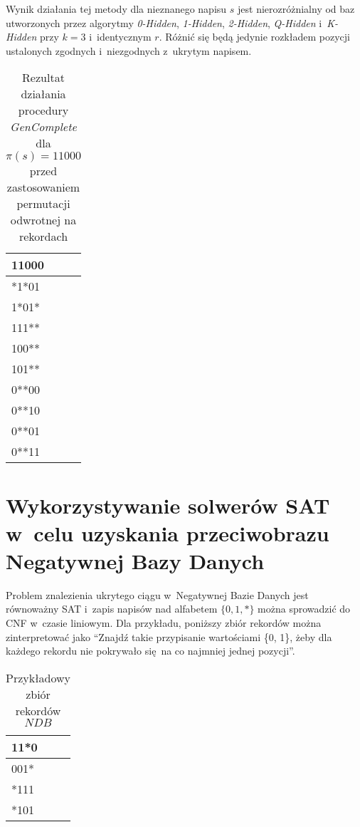 Wynik działania tej metody dla nieznanego napisu $s$ jest nierozróżnialny od baz utworzonych przez algorytmy \textit{0-Hidden}, \textit{1-Hidden},
\textit{2-Hidden}, \textit{Q-Hidden} i~\textit{K-Hidden} przy $k = 3$ i~identycznym $r$. Różnić się będą jedynie rozkładem pozycji
ustalonych zgodnych i~niezgodnych z~ukrytym napisem.


\begin{table}[!tb]
    \centering
    \begin{tabular}{|l|}
        \hline
        \textbf{11000} \\ \hline
        *1*01          \\
        1*01*          \\
        111**          \\
        100**          \\
        101**          \\
        0**00          \\
        0**10          \\
        0**01          \\
        0**11          \\ \hline
    \end{tabular}
    \caption{Rezultat działania procedury \textit{GenComplete} dla $\pi(s) = 11000$ przed zastosowaniem permutacji odwrotnej na rekordach}
    \label{tbl:gencomplete_results}
\end{table}

\section{Wykorzystywanie solwerów SAT w~celu uzyskania przeciwobrazu Negatywnej Bazy Danych}

Problem znalezienia ukrytego ciągu w~Negatywnej Bazie Danych jest równoważny SAT i~zapis napisów nad alfabetem 
$\{0, 1, *\}$ można sprowadzić do CNF w~czasie liniowym.
Dla przykładu, poniższy zbiór rekordów można zinterpretować jako 
\enquote{Znajdź takie przypisanie wartościami \{0, 1\}, żeby dla każdego rekordu nie pokrywało się na co najmniej jednej pozycji}.

\begin{table}[h]
    
    \centering
    \label{Tbl:NDB-sat-example}
    \begin{tabular}{|l|}
        \hline
        11*0 \\ \hline
        001* \\ \hline
        *111 \\ \hline
        *101 \\ \hline
    \end{tabular}
    \caption{Przykładowy zbiór rekordów $NDB$}
\end{table}

